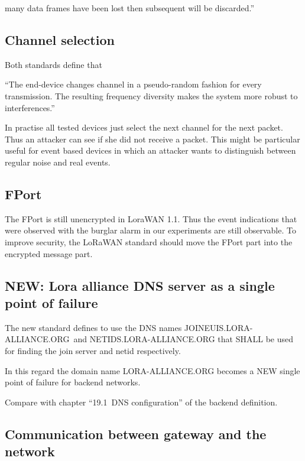 {many data frames have been lost then subsequent will be discarded.''}

\hypertarget{h.7ctbv6nd7du7}{\subsection{\texorpdfstring{{Channel
selection}}{Channel selection}}\label{h.7ctbv6nd7du7}}

{Both standards define that }

{``The end-device changes channel in a pseudo-random fashion for every
transmission. The resulting frequency diversity makes the system more
robust to interferences.''}

{In practise all tested devices just select the next channel for the
next packet. Thus an attacker can see if she did not receive a packet.
This might be particular useful for event based devices in which an
attacker wants to distinguish between regular noise and real events.}

\hypertarget{h.i6r97yb5iafg}{\subsection{\texorpdfstring{{FPort}}{FPort}}\label{h.i6r97yb5iafg}}

{The FPort is still unencrypted in LoraWAN 1.1. Thus the event
indications that were observed with the burglar alarm in our experiments
are still observable. To improve security, the LoRaWAN standard should
move the FPort part into the encrypted message part.}

\hypertarget{h.mdrkurwqvvj8}{\subsection{\texorpdfstring{{NEW: Lora
alliance DNS server as a single point of
failure}}{NEW: Lora alliance DNS server as a single point of failure}}\label{h.mdrkurwqvvj8}}

{The new standard defines to use the DNS names
}{JOINEUIS.LORA-ALLIANCE.ORG}{~and }{NETIDS.LORA-ALLIANCE.ORG }{that
SHALL be used for finding the join server and netid respectively.}

{In this regard the domain name }{LORA-ALLIANCE.ORG }{becomes a }{NEW
single point of failure }{for backend networks.}

{Compare with chapter ``19.1}{~DNS configuration'' of the backend
definition.}

\hypertarget{h.mn1ux3159m0}{\subsection{\texorpdfstring{{Communication
between gateway and the
network}}{Communication between gateway and the network}}\label{h.mn1ux3159m0}}


